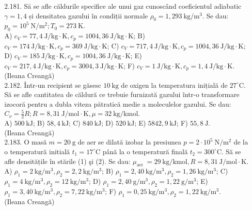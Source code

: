2.181. Să se afle căldurile specifice ale unui gaz cunoscând coeficientul adiabatic $\gamma=1,4$ și densitatea gazului în condiții normale $\rho_{0}=1,293 \mathrm{~kg} / \mathrm{m}^{3}$. Se dau: $p_{0}=10^{5} \mathrm{~N} / \mathrm{m}^{2} ; T_{0}=273 \mathrm{~K}$.\\ A) $c_{V}=77,4 \mathrm{~J} / \mathrm{kg} \cdot \mathrm{K} , c_{p}=1004,36 \mathrm{~J} / \mathrm{kg} \cdot \mathrm{K}$; B) $c_{V}=174 \mathrm{~J} / \mathrm{kg} \cdot \mathrm{K} , c_{p}=369 \mathrm{~J} / \mathrm{kg} \cdot \mathrm{K}$; C) $c_{V}=717,4 \mathrm{~J} / \mathrm{kg} \cdot \mathrm{K} , c_{p}=1004,36 \mathrm{~J} / \mathrm{kg} \cdot \mathrm{K}$; D) $c_{V}=185 \mathrm{~J} / \mathrm{kg} \cdot \mathrm{K} , c_{p}=1004,36 \mathrm{~J} / \mathrm{kg} \cdot \mathrm{K}$; E) $c_{V}=217,4 \mathrm{~J} / \mathrm{kg} \cdot \mathrm{K} , c_{p}=3004,3 \mathrm{~J} / \mathrm{kg} \cdot \mathrm{K}$; F) $c_{V}=1 \mathrm{~J} / \mathrm{kg} \cdot \mathrm{K} , c_{p}=1,4 \mathrm{~J} / \mathrm{kg} \cdot \mathrm{K}$.\\ (Ileana Creangă)\\

2.182. Într-un recipient se găsesc $10 \mathrm{~kg}$ de oxigen la temperatura inițială de $27^{\circ} \mathrm{C}$. Să se afle cantitatea de căldură ce trebuie furnizată gazului într-o transformare izocoră pentru a dubla viteza pătratică medie a moleculelor gazului. Se dau: $C_{\nu}=\frac{5}{2} R ; R=8,31 \mathrm{~J} / \mathrm{mol} \cdot \mathrm{K}, \mu=32 \mathrm{~kg} / \mathrm{kmol}$.\\ A) $500 \mathrm{~kJ}$; B) $58,4 \mathrm{~kJ}$; C) $840 \mathrm{~kJ}$; D) $520 \mathrm{~kJ}$; E) $5842,9 \mathrm{~kJ}$; F) $55,8 \mathrm{~J}$.\\ (Ileana Creangă)\\

2.183. O masă $m=20 \mathrm{~g}$ de aer se dilată izobar la presiunea $p=2 \cdot 10^{5} \mathrm{~N} / \mathrm{m}^{2}$ de la o temperatură initială $t_{1}=17^{\circ} \mathrm{C}$ până la o temperatură finală $t_{2}=300^{\circ} \mathrm{C}$. Să se afle densitățile în stările (1) şi (2). Se dau: $\mu_{\text {aer }}=29 \mathrm{~kg} / \mathrm{kmol}, R=8,31 \mathrm{~J} / \mathrm{mol} \cdot \mathrm{K}$.\\ A) $\rho_{1}=2 \mathrm{~kg} / \mathrm{m}^{3}, \rho_{2}=2,2 \mathrm{~kg} / \mathrm{m}^{3}$; B) $\rho_{1}=2,40 \mathrm{~kg} / \mathrm{m}^{3}, \rho_{2}=1,26 \mathrm{~kg} / \mathrm{m}^{3}$; C) $\rho_{1}=4 \mathrm{~kg} / \mathrm{m}^{3}, \rho_{2}=12 \mathrm{~kg} / \mathrm{m}^{3}$; D) $\rho_{1}=2,40 \mathrm{~g} / \mathrm{m}^{3}, \rho_{2}=1,22 \mathrm{~g} / \mathrm{m}^{3}$; E) $\rho_{1}=3,40 \mathrm{~kg} / \mathrm{m}^{3}, \rho_{2}=7,22 \mathrm{~kg} / \mathrm{m}^{3}$; F) $\rho_{1}=0,25 \mathrm{~kg} / \mathrm{m}^{3}, \rho_{2}=1,22 \mathrm{~kg} / \mathrm{m}^{3}$.\\ (Ileana Creangă)\\

